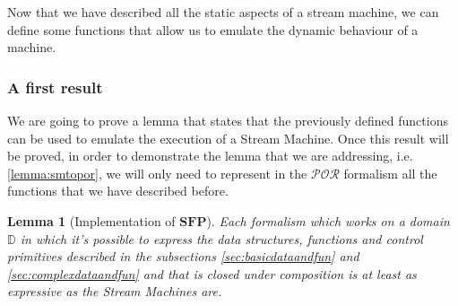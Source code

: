 \documentclass[10pt]{amsart}
\newcommand{\SFP}{\mathbf{SFP}}
\newcommand{\POR}{\mathcal{POR}}
\newcommand{\DD}{\mathbb{D}}
\newtheorem{lemma}{Lemma}
\begin{document}
Now that we have described all the static aspects of a stream machine, we can define some functions that allow us to emulate the dynamic behaviour of a machine.

\subsubsection{A first result}

We are going to prove a lemma that states that the previously defined functions can be used to emulate the execution of a Stream Machine. Once this result will be proved, in order to demonstrate the lemma that we are addressing, i.e. \ref{lemma:smtopor}, we will only need to represent in the $\POR$ formalism all the functions that we have described before.

\begin{lemma}[Implementation of $\SFP$]
\label{lemma:sfpimpl}
Each formalism which works on a domain $\DD$ in which it's possible to express the data structures, functions and control primitives described in the subsections \ref{sec:basicdataandfun} and \ref{sec:complexdataandfun} and that is closed under composition is at least as expressive as the Stream Machines are.
\end{lemma}
\end{document}
